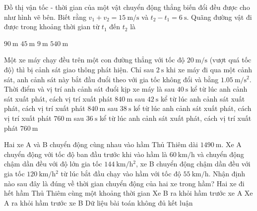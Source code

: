 \begin{ex}
Đồ thị vận tốc - thời gian của một vật chuyển động thẳng biến đổi đều được cho như hình vẽ bên. Biết rằng $v_1+v_2=\SI{15}{\meter/\second}$ và $t_2-t_1=\SI{6}{\second}$. Quãng đường vật đi được trong khoảng thời gian từ $t_1$ đến $t_2$ là
\begin{center}
\end{center}	
	\choice
	{$\SI{90}{\meter}$}
	{\True $\SI{45}{\meter}$}
	{$\SI{9}{\meter}$}
	{$\SI{540}{\meter}$}
	\loigiai{}
\end{ex}
\begin{ex}
	Một xe máy chạy đều trên một con đường thẳng với tốc độ $\SI{20}{\meter/\second}$ (vượt quá tốc độ) thì bị cảnh sát giao thông phát hiện. Chỉ sau $\SI{2}{\second}$ khi xe máy đi qua một cảnh sát, anh cảnh sát này bắt đầu đuổi theo với gia tốc không đổi và bằng $\SI{1.05}{\meter/\second^2}$. Thời điểm và vị trí anh cảnh sát đuổi kịp xe máy là
	\choice
	{\True sau $\SI{40}{\second}$ kể từ lúc anh cảnh sát xuất phát, cách vị trí xuất phát $\SI{840}{\meter}$}
	{sau $\SI{42}{\second}$ kể từ lúc anh cảnh sát xuất phát, cách vị trí xuất phát $\SI{840}{\meter}$}
	{sau $\SI{38}{\second}$ kể từ lúc anh cảnh sát xuất phát, cách vị trí xuất phát $\SI{760}{\meter}$}
	{sau $\SI{36}{\second}$ kể từ lúc anh cảnh sát xuất phát, cách vị trí xuất phát $\SI{760}{\meter}$}
	\loigiai{}
\end{ex}
\begin{ex}
	Hai xe A và B chuyển động cùng nhau vào hầm Thủ Thiêm dài $\SI{1490}{\meter}$. Xe A chuyển động với tốc độ ban đầu trước khi vào hầm là $\SI{60}{\kilo\meter/\hour}$ và chuyển động chậm dần đều với độ lớn gia tốc $\SI{144}{\kilo\meter/\hour^2}$, xe B chuyển động chậm dần đều với gia tốc $\SI{120}{\kilo\meter/\hour^2}$	từ lúc bắt đầu chạy vào hầm với tốc độ $\SI{55}{\kilo\meter/\hour}$. Nhận định nào sau đây là đúng về thời gian chuyển động của hai xe trong hầm?
	\choice
	{Hai xe đi hết hầm Thủ Thiêm cùng một khoảng thời gian}
	{Xe B ra khỏi hầm trước xe A}
	{\True Xe A ra khỏi hầm trước xe B}
	{Dữ liệu bài toán không đủ kết luận}
	\loigiai{}
\end{ex}
